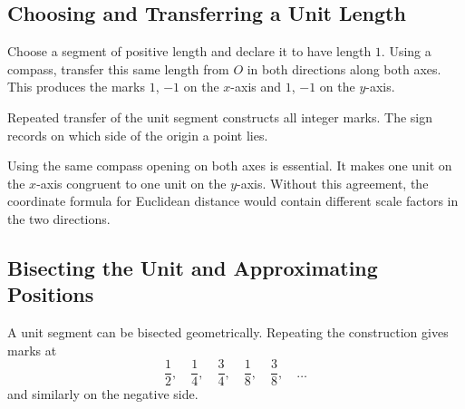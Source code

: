 \subsection{Choosing and Transferring a Unit Length}

Choose a segment of positive length and declare it to have length $1$.  Using a
compass, transfer this same length from $O$ in both directions along both axes.
This produces the marks $1$, $-1$ on the $x$-axis and $1$, $-1$ on the
$y$-axis.

\begin{center}
\end{center}

Repeated transfer of the unit segment constructs all integer marks.  The sign
records on which side of the origin a point lies.

\begin{remarkbox}
Using the same compass opening on both axes is essential.  It makes one unit on
the $x$-axis congruent to one unit on the $y$-axis.  Without this agreement, the
coordinate formula for Euclidean distance would contain different scale
factors in the two directions.
\end{remarkbox}

\subsection{Bisecting the Unit and Approximating Positions}

A unit segment can be bisected geometrically.  Repeating the construction gives
marks at
\[
\frac12,\quad \frac14,\quad \frac34,\quad \frac18,\quad \frac38,
\quad \ldots
\]
and similarly on the negative side.

\begin{center}
\end{center}

